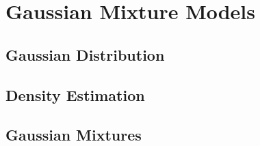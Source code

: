 \section{Gaussian Mixture Models}

\subsection{Gaussian Distribution}

\subsection{Density Estimation}

\subsection{Gaussian Mixtures}